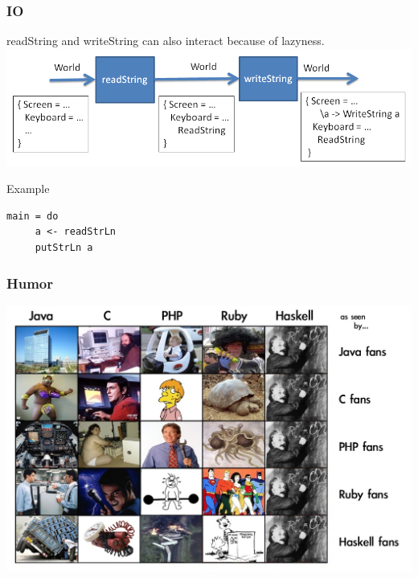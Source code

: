 \documentclass{beamer}
\begin{document}
\begin{frame}[fragile]
\frametitle{IO}
 readString and writeString can also interact because of lazyness.
 \vspace{0.5cm}
 \includegraphics[width=1\linewidth]{figs/pureReadWrite}
 \vspace{0.5cm}
 \begin{block}{Example}
  \begin{lstlisting}[basicstyle=\small]
   main = do
     a <- readStrLn
     putStrLn a
  \end{lstlisting}
 \end{block}
\end{frame}

\begin{frame}
\frametitle{Humor}
 \includegraphics[width=1\linewidth]{figs/langs}
\end{frame}

%
%  
% 
%  
%
% 


\end{document}
